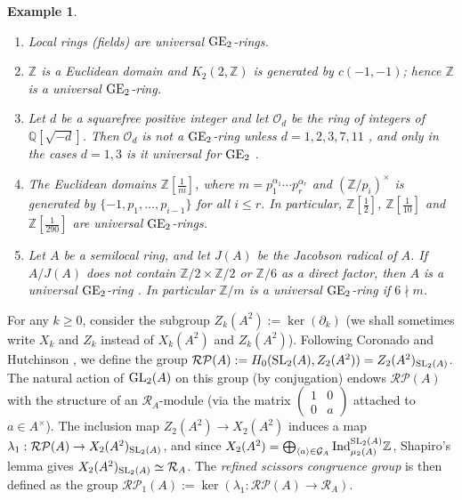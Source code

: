 \documentclass[11pt]{amsart}
\theoremstyle{definition}
\theoremstyle{plain}
\newtheorem{exm}[ntn]{Example}
\numberwithin{equation}{section}
\newcommand{\z}{\mathbb{Z}}
\newcommand{\q}{\mathbb{Q}}
\newcommand{\GG}{\mathcal{G}}
\newcommand{\RR}{\mathcal{R}}
\newcommand{\RP}{\mathcal{RP}}
\renewcommand{\aa}{{A^\times}}
\newcommand{\half}{{\left[\frac{1}{2}\right]}}
\newcommand{\lan}{\langle}
\newcommand{\ran}{\rangle}
\newcommand{\GE}{{\rm GE}}
\newcommand{\Ind}{{\rm Ind}}
\newcommand{\GL}{\mathit{{\rm GL}}}
\newcommand{\SL}{\mathit{{\rm SL}}}
\newcommand{\mtxx}[4]
{\left(\!\!
\begin{array}{cc}
\!\!#1 & \!\!#2\\
\!\!#3 & \!\!#4
\end{array}\!\!
\right)}
\begin{document}
\begin{exm}
    \label{ex-ge2}
    \begin{enumerate}
        \item \cite[\S 4]{cohn1966} Local rings (fields) are universal $\GE_2$-rings.
        \item \cite[Example 4.7]{C-H2022} $\z$ is a Euclidean domain and $K_2(2,\z)$ is generated by $c(-1,-1)$; hence $\z$ is a universal $\GE_2$-ring.
        \item Let $d$ be a squarefree positive integer and let $\mathcal{O}_d$ be the ring of integers of $\q[\sqrt{-d}]$. Then $\mathcal{O}_d$ is not a $\GE_2$-ring unless $d=1,2,3,7,11$ \cite[Theorem 6.1]{cohn1966}, and only in the cases $d=1,3$ is it universal for $\GE_2$ \cite[Remarks]{cohn1968}.
        \item \cite[Example 4.8 (Morita)]{C-H2022} The Euclidean domains $\z\left[\frac{1}{m}\right]$, where $m=p_1^{\alpha_1}\cdots p_r^{\alpha_r}$ and $(\z/p_i)^\times$ is generated by $\{-1,p_1,\dots,p_{i-1}\}$ for all $i\leq r$. In particular, $\z\half$, $\z\left[\frac{1}{10}\right]$ and $\z\left[\frac{1}{290}\right]$ are universal $\GE_2$-rings.
        \item Let $A$ be a semilocal ring, and let $J(A)$ be the Jacobson radical of $A$. If $A/J(A)$ does not contain $\z/2\times\z/2$ or $\z/6$ as a direct factor, then $A$ is a universal $\GE_2$-ring \cite[p. 1165]{B-E-2025-I}. In particular $\z/m$ is a universal $\GE_2$-ring if $6\nmid m$.
    \end{enumerate}
\end{exm}

For any $k\geq 0$, consider the subgroup $Z_k(A^2):=\ker(\partial_k)$ (we shall sometimes write $X_k$ and $Z_k$ instead of $X_k(A^2)$ and $Z_k(A^2)$). Following Coronado and Hutchinson \cite{C-H2022}, we define the group $\RP(A):=H_0(\SL_2(A),Z_2(A^2))=Z_2(A^2)_{\SL_2(A)}$. The natural action of $\GL_2(A)$ on this group (by conjugation) endows $\RP(A)$ with the structure of an $\RR_A$-module (via the matrix $\mtxx{1}{0}{0}{a}$ attached to $a\in\aa$). The inclusion map $Z_2(A^2)\to X_2(A^2)$ induces a map $\lambda_1:\RP(A)\to X_2(A^2)_{\SL_2(A)}$, and since $X_2(A^2)=\bigoplus_{\lan a\ran\in\GG_A}\Ind_{\mu_2(A)}^{\SL_2(A)}\z$, Shapiro's lemma gives $X_2(A^2)_{\SL_2(A)}\simeq\RR_A$. The \textit{refined scissors congruence group} is then defined as the group $\RP_1(A):=\ker(\lambda_1:\RP(A)\to\RR_A)$. 
\end{document}
